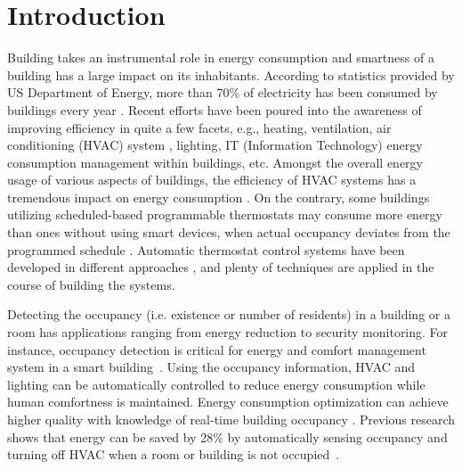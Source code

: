 \section{Introduction}
\label{sec:intro}
Building takes an instrumental role in energy consumption and smartness of a
building has a large impact on its inhabitants. According to
statistics provided by US Department of Energy, more than 70\% of electricity
has been consumed by buildings every year \cite{doe_annual}. Recent efforts
have been poured into the awareness of
improving efficiency in quite a few facets, e.g., heating, ventilation, air
conditioning (HVAC) system \cite{erickson2009energy}\cite{gao2009selfprog},
lighting\cite{delaney2009eval}, IT (Information Technology) energy consumption management within
buildings\cite{agarwal2009augnet}\cite{agarwal2010sleep}, etc. Amongst the
overall energy usage of various aspects of buildings, the efficiency of HVAC
systems has a tremendous impact on energy consumption \cite{hobby2012analysis}.
On the contrary, some buildings utilizing scheduled-based
programmable thermostats may consume more energy than ones without using smart
devices, when actual occupancy deviates from the programmed schedule
\cite{bias1999elec}. Automatic thermostat control systems have been developed
in different approaches \cite{thomas2012intelligent}\cite{lu2012eval}, and
plenty of techniques are applied in the course of building the systems.

Detecting the occupancy (i.e. existence or number of residents) in a building or a
room has applications ranging from energy reduction to security monitoring. For
instance, occupancy detection is critical for energy and comfort management
system in a smart building~\cite{Nguyen2013Energy}.  Using the occupancy
information, HVAC and lighting can be automatically controlled to reduce energy
consumption while human comfortness is maintained. Energy consumption optimization can
achieve higher quality with knowledge of real-time building occupancy
\cite{majumdar2014energy}. Previous research shows that energy
can be saved by 28\% by automatically sensing occupancy and turning off HVAC
when a room or building is not occupied~\cite{Lu:SenSys10}.

